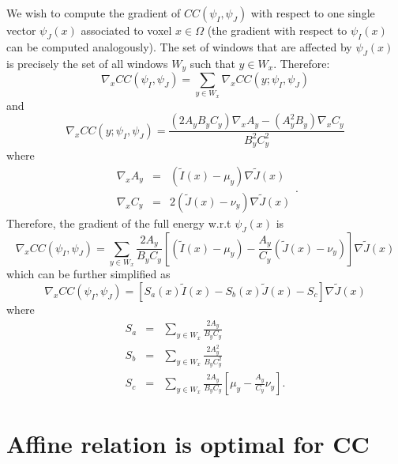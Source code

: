 We wish to compute the gradient of $CC(\psi_{I}, \psi_{J})$ with respect to one single vector $\psi_{J}(x)$ associated to voxel $x\in\Omega$ (the gradient with respect to
$\psi_{I}(x)$ can be computed analogously). The set of windows that are affected by $\psi_{J}(x)$ is
precisely the set of all windows $W_{y}$ such that $y \in W_{x}$. Therefore:
\begin{equation}
    \nabla_{x} CC(\psi_{I}, \psi_{J}) = \sum_{y \in W_{x}} \nabla_{x} CC(y; \psi_{I}, \psi_{J})
\end{equation}
and
\begin{equation}
    \nabla_{x} CC(y; \psi_{I}, \psi_{J}) = \frac{\left(2A_{y} B_{y}C_{y}\right)\nabla_{x}A_{y} - \left(A_{y}^{2}B_{y}\right)\nabla_{x}C_{y}}
                                                {B_{y}^{2} C_{y}^{2}}
\end{equation}
where
\begin{equation}
    \begin{array}{lll}
    \nabla_{x}A_{y} &=& (\tilde{I}(x) - \mu_{y})\nabla \tilde{J}(x)\\
    \nabla_{x}C_{y} &=& 2(\tilde{J}(x) - \nu_{y})\nabla \tilde{J}(x)
    \end{array}.
\end{equation}
Therefore, the gradient of the full energy w.r.t $\psi_{J}(x)$ is
\begin{equation}
    \nabla_{x} CC(\psi_{I}, \psi_{J}) = \sum_{y \in W_{x}} \frac{2A_{y}}{B_{y}C_{y}}\left[ (\tilde{I}(x) - \mu_{y}) - \frac{A_{y}}{C_{y}}\left(\tilde{J}(x) - \nu_{y}\right)\right]\nabla \tilde{J}(x)
\end{equation}
which can be further simplified as
\begin{equation}
    \nabla_{x} CC(\psi_{I}, \psi_{J}) = \left[S_{a}(x) \tilde{I}(x) - S_{b}(x)\tilde{J}(x) - S_{c}\right]\nabla \tilde{J}(x)
\end{equation}
where
\begin{equation}
    \begin{array}{lll}
        S_{a} &=& \sum_{y \in W_{x}} \frac{2A_{y}}{B_{y}C_{y}}\\
        S_{b} &=& \sum_{y \in W_{x}} \frac{2A_{y}^{2}}{B_{y}C_{y}^{2}}\\
        S_{c} &=& \sum_{y \in W_{x}} \frac{2A_{y}}{B_{y}C_{y}} \left[ \mu_{y} - \frac{A_{y}}{C_{y}}\nu_{y}\right].
    \end{array}
\end{equation}

\section{Affine relation is optimal for CC}

